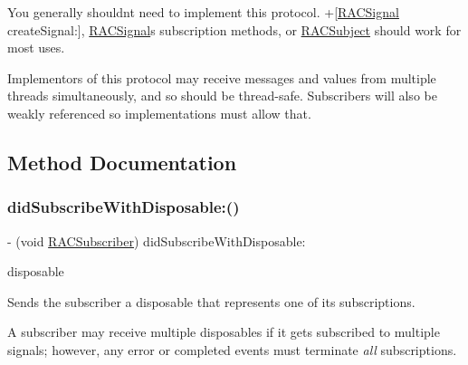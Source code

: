 You generally shouldn\textquotesingle{}t need to implement this protocol. +\mbox{[}\mbox{\hyperlink{interface_r_a_c_signal}{R\+A\+C\+Signal}} create\+Signal\+:\mbox{]}, \mbox{\hyperlink{interface_r_a_c_signal}{R\+A\+C\+Signal}}\textquotesingle{}s subscription methods, or \mbox{\hyperlink{interface_r_a_c_subject}{R\+A\+C\+Subject}} should work for most uses.

Implementors of this protocol may receive messages and values from multiple threads simultaneously, and so should be thread-\/safe. Subscribers will also be weakly referenced so implementations must allow that. 

\subsection{Method Documentation}
\mbox{\label{protocol_r_a_c_subscriber_01-p_a44012a5efac0242765bfb0a98180654d}} 
\subsubsection{\texorpdfstring{did\+Subscribe\+With\+Disposable\+:()}{didSubscribeWithDisposable:()}\hspace{0.1cm}{\footnotesize\ttfamily [1/3]}}
{\footnotesize\ttfamily -\/ (void \mbox{\hyperlink{interface_r_a_c_subscriber}{R\+A\+C\+Subscriber}}) did\+Subscribe\+With\+Disposable\+: \begin{DoxyParamCaption}\item[{(\mbox{\hyperlink{interface_r_a_c_compound_disposable}{R\+A\+C\+Compound\+Disposable}} $\ast$)}]{disposable }\end{DoxyParamCaption}\hspace{0.3cm}{\ttfamily [required]}}

Sends the subscriber a disposable that represents one of its subscriptions.

A subscriber may receive multiple disposables if it gets subscribed to multiple signals; however, any error or completed events must terminate {\itshape all} subscriptions. \mbox{\label{protocol_r_a_c_subscriber_01-p_a44012a5efac0242765bfb0a98180654d}} 
